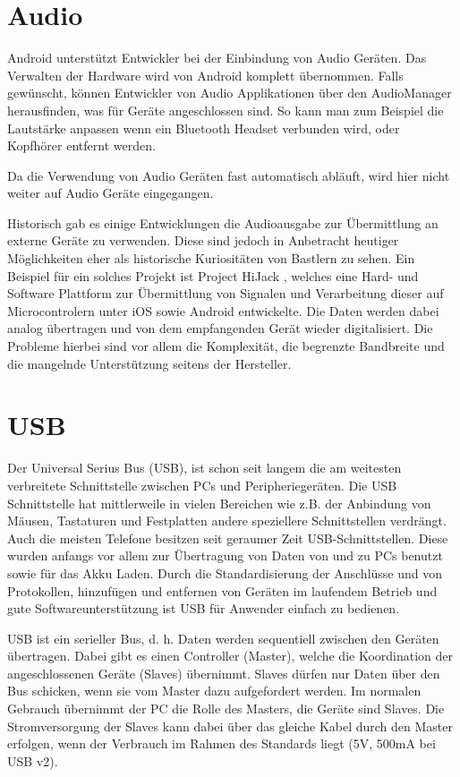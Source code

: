 \documentclass[12pt,journal,compsoc]{IEEEtran}
\begin{document}
\section{Audio}
Android unterstützt Entwickler bei der Einbindung von Audio Geräten. Das Verwalten der Hardware wird von Android komplett übernommen.
Falls gewünscht, können Entwickler von Audio Applikationen über den AudioManager herausfinden, was für Geräte angeschlossen sind. So kann man zum Beispiel die Lautstärke anpassen wenn ein Bluetooth Headset verbunden wird, oder Kopfhörer entfernt werden.

Da die Verwendung von Audio Geräten fast automatisch abläuft, wird hier nicht weiter auf Audio Geräte eingegangen.

Historisch gab es einige Entwicklungen die Audioausgabe zur Übermittlung an externe Geräte zu verwenden. Diese sind jedoch in Anbetracht heutiger Möglichkeiten eher als historische Kuriositäten von Bastlern zu sehen.
Ein Beispiel für ein solches Projekt ist Project HiJack \cite{hijack} , welches eine Hard- und Software Plattform zur Übermittlung von Signalen und Verarbeitung dieser auf Microcontrolern unter iOS sowie Android entwickelte.
Die Daten werden dabei analog übertragen und von dem empfangenden Gerät wieder digitalisiert.
Die Probleme hierbei sind vor allem die Komplexität, die begrenzte Bandbreite und die mangelnde Unterstützung seitens der Hersteller.

\section{USB}
Der Universal Serius Bus (USB), ist schon seit langem die am weitesten verbreitete Schnittstelle zwischen PCs und Peripheriegeräten.
Die USB Schnittstelle hat mittlerweile in vielen Bereichen wie z.B. der Anbindung von Mäusen, Tastaturen und Festplatten andere speziellere Schnittstellen verdrängt.
Auch die meisten Telefone besitzen seit geraumer Zeit USB-Schnittstellen. Diese wurden anfangs vor allem zur Übertragung von Daten von und zu PCs benutzt sowie für das Akku Laden.
Durch die Standardisierung der Anschlüsse und von Protokollen, hinzufügen und entfernen von Geräten im laufendem Betrieb und gute Softwareunterstützung ist USB für Anwender einfach zu bedienen.

USB ist ein serieller Bus, d. h. Daten werden sequentiell zwischen den Geräten übertragen. 
Dabei gibt es einen Controller (Master), welche die Koordination der angeschlossenen Geräte (Slaves) übernimmt.
Slaves dürfen nur Daten über den Bus schicken, wenn sie vom Master dazu aufgefordert werden.
Im normalen Gebrauch übernimmt der PC die Rolle des Masters, die Geräte sind Slaves. Die Stromversorgung der Slaves kann dabei über das gleiche Kabel durch den Master erfolgen, wenn der Verbrauch im Rahmen des Standards liegt (5V, 500mA bei USB v2).
\end{document}
